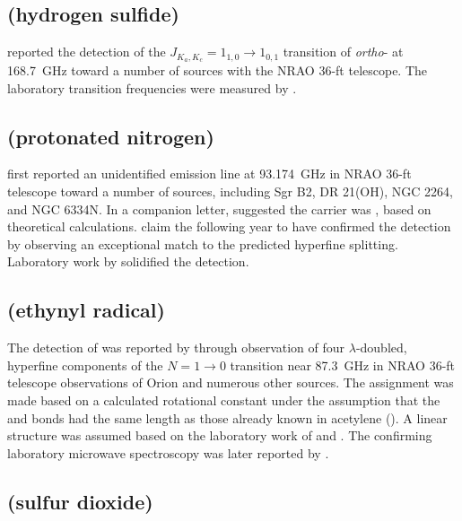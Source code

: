 \documentclass[twocolumn]{aastex631}
\begin{document}
    \subsection{ (hydrogen sulfide)}
    \label{H2S}
    
    \citet{Thaddeus:1972oh} reported the detection of the $J_{K_a,K_c} = 1_{1,0}\rightarrow1_{0,1}$ transition of \emph{ortho}- at 168.7~GHz toward a number of sources with the NRAO 36-ft telescope.  The laboratory transition frequencies were measured by \citet{Cupp:1968yg}.
    
    \subsection{ (protonated nitrogen)}
    \label{N2H+}
    
    \citet{Turner:1974jk} first reported an unidentified emission line at 93.174~GHz in NRAO 36-ft telescope toward a number of sources, including Sgr B2, DR 21(OH), NGC 2264, and NGC 6334N.  In a companion letter, \citet{Green:1974gc} suggested the carrier was , based on theoretical calculations.  \citet{Thaddeus:1975uh} claim the following year to have confirmed the detection by observing an exceptional match to the predicted  hyperfine splitting.  Laboratory work by \citet{Saykally:1976ke} solidified the detection.
    
    \subsection{ (ethynyl radical)}
    \label{C2H}
    
    The detection of  was reported by \citet{Tucker:1974fs} through observation of four $\lambda$-doubled, hyperfine components of the $N = 1\rightarrow0$ transition near 87.3~GHz in NRAO 36-ft telescope observations of Orion and numerous other sources.  The assignment was made based on a calculated rotational constant under the assumption that the  and  bonds had the same length as those already known in acetylene ().  A linear structure was assumed based on the laboratory work of \citet{Cochran:1964dy} and \citet{Graham:1974kx}.  The confirming laboratory microwave spectroscopy was later reported by \citet{Sastry:1981kj}.
    
    \subsection{ (sulfur dioxide)}
    \label{SO2}
    
\end{document}
